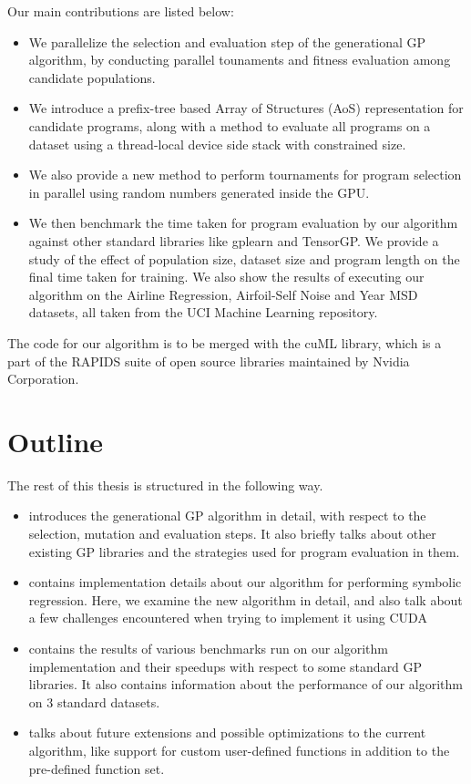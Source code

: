 Our main contributions are listed below:
\begin{itemize}
  \item We parallelize the selection and evaluation step of the generational GP algorithm, by conducting parallel tounaments and fitness evaluation among candidate populations. 
  \item We introduce a prefix-tree based Array of Structures (AoS) representation for candidate programs, along with a method to evaluate all programs on a dataset using a thread-local device side stack with constrained size. 
  \item We also provide a new method to perform tournaments for program selection in parallel using random numbers generated inside the GPU. 
  \item We then benchmark the time taken for program evaluation by our algorithm against other standard libraries like gplearn\citep{gplearn} and TensorGP\citep{baeta2021tensorgp}. We provide a study of the effect of population size, dataset size and program length on the final time taken for training. We also show the results of executing our algorithm on the Airline Regression, Airfoil-Self Noise and Year MSD datasets, all taken from the UCI Machine Learning repository\citep{Dua:2019}.
\end{itemize}
The code for our algorithm is to be merged with the cuML library\citep{raschka2020machine}, which is a part of the RAPIDS suite of open source libraries maintained by Nvidia Corporation.

\section{Outline}
\label{intro:outline}

The rest of this thesis is structured in the following way. 
\begin{itemize}
  \item {} introduces the generational GP algorithm in detail, with respect to the selection, mutation and evaluation steps. It also briefly talks about other existing GP libraries and the strategies used for program evaluation in them. 
  \item {} contains implementation details about our algorithm for performing symbolic regression. Here, we examine the new algorithm in detail, and also talk about a few challenges encountered when trying to implement it using CUDA
  \item {} contains the results of various benchmarks run on our algorithm implementation and their speedups with respect to some standard GP libraries. It also contains information about the performance of our algorithm on $3$ standard datasets.
  \item {} talks about future extensions and possible optimizations to the current algorithm, like support for custom user-defined functions in addition to the pre-defined function set.
\end{itemize}

